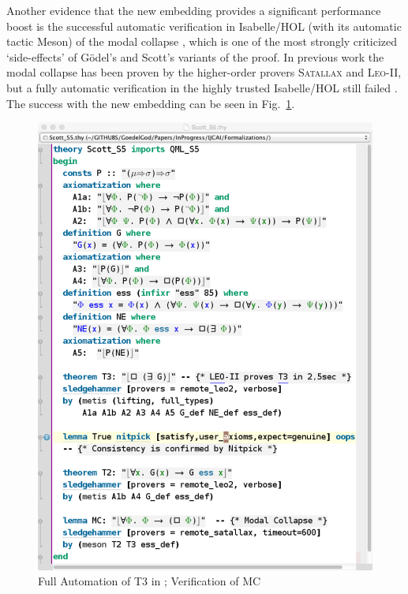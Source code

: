 \documentclass{article}
\begin{document}
Another evidence that the new embedding provides a significant performance boost 
is the successful automatic verification in Isabelle/HOL (with its automatic tactic Meson) of the modal
collapse \cite{Sobel}, which is one of the most strongly criticized
`side-effects' of G\"odel's and Scott's variants of the proof. In previous work 
the modal collapse has been proven by the higher-order provers
\textsc{Satallax} \cite{Satallax} and \textsc{Leo-II}, but a fully automatic
verification in the highly trusted Isabelle/HOL still failed \cite{ArchiveFormalProofsGoedelGod}. The success with the new embedding can be seen in Fig.~\ref{Scott_S5}.

\begin{figure}
\centerline{\includegraphics[width=\columnwidth]{./Images/Scott_S5.png}}
\caption{Full Automation of T3 in \SFiveU; Verification of MC} \label{Scott_S5}
\end{figure}
\end{document}
